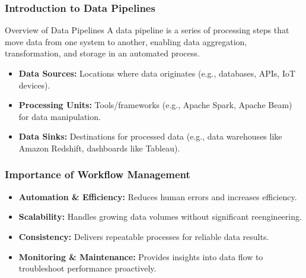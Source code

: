 \documentclass[aspectratio=169]{beamer}
\begin{document}
\frame{\titlepage}

\begin{frame}[fragile]
    \maketitle
\end{frame}

\begin{frame}[fragile]
    \frametitle{Introduction to Data Pipelines}
    \begin{block}{Overview of Data Pipelines}
        A data pipeline is a series of processing steps that move data from one system to another, enabling data aggregation, transformation, and storage in an automated process.
    \end{block}
    
    \begin{itemize}
        \item \textbf{Data Sources:} Locations where data originates (e.g., databases, APIs, IoT devices).
        \item \textbf{Processing Units:} Tools/frameworks (e.g., Apache Spark, Apache Beam) for data manipulation.
        \item \textbf{Data Sinks:} Destinations for processed data (e.g., data warehouses like Amazon Redshift, dashboards like Tableau).
    \end{itemize}
\end{frame}

\begin{frame}[fragile]
    \frametitle{Importance of Workflow Management}
    \begin{itemize}
        \item \textbf{Automation \& Efficiency:} Reduces human errors and increases efficiency.
        \item \textbf{Scalability:} Handles growing data volumes without significant reengineering.
        \item \textbf{Consistency:} Delivers repeatable processes for reliable data results.
        \item \textbf{Monitoring \& Maintenance:} Provides insights into data flow to troubleshoot performance proactively.
    \end{itemize}
\end{frame}
\end{document}
